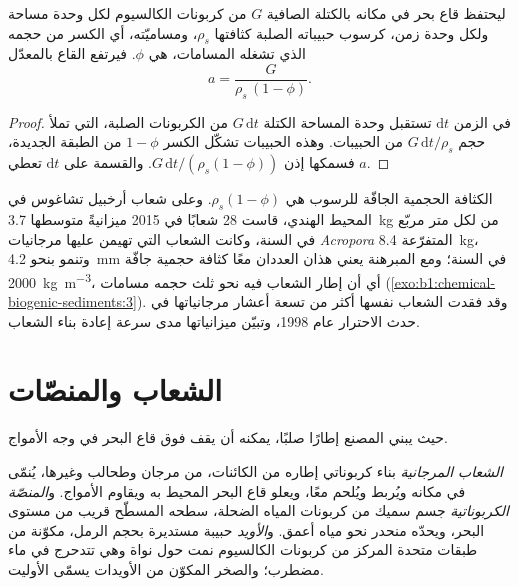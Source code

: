 \begin{proposition}\label{prop:b1:chemical-biogenic-sediments:accretion}
ليحتفظ قاع بحر في مكانه بالكتلة الصافية $G$ من كربونات الكالسيوم لكل وحدة مساحة ولكل وحدة زمن، كرسوب حبيباته الصلبة كثافتها $\rho_s$، ومساميّته، أي الكسر من حجمه الذي تشغله المسامات، هي $\phi$. فيرتفع القاع بالمعدّل
\[
a = \frac{G}{\rho_s\,(1-\phi)}.
\]
\end{proposition}

\begin{proof}
في الزمن $\mathrm dt$ تستقبل وحدة المساحة الكتلة $G\,\mathrm dt$ من الكربونات الصلبة، التي تملأ حجم $G\,\mathrm dt/\rho_s$ من الحبيبات. وهذه الحبيبات تشكّل الكسر $1-\phi$ من الطبقة الجديدة، فسمكها إذن $G\,\mathrm dt/(\rho_s(1-\phi))$. والقسمة على $\mathrm dt$ تعطي $a$.
\end{proof}

الكثافة الحجمية الجافّة للرسوب هي $\rho_s(1-\phi)$. وعلى شعاب أرخبيل تشاغوس في المحيط الهندي، قاست 28 شعابًا في 2015 ميزانيةً متوسطها \qty{3.7}{kg} من  لكل متر مربّع في السنة، وكانت الشعاب التي تهيمن عليها مرجانيات \emph{Acropora} المتفرّعة \qty{8.4}{kg}، وتنمو بنحو \qty{4.2}{mm} في السنة؛ ومع المبرهنة يعني هذان العددان معًا كثافة حجمية جافّة \qty{2000}{kg.m^{-3}}، أي أن إطار الشعاب فيه نحو ثلث حجمه مسامات (\cref{exo:b1:chemical-biogenic-sediments:3}). وقد فقدت الشعاب نفسها أكثر من تسعة أعشار مرجانياتها في حدث الاحترار عام 1998، وتبيّن ميزانياتها مدى سرعة إعادة بناء الشعاب.

\section{الشعاب والمنصّات}\label{sec:b1:chemical-biogenic-sediments:reefs}

حيث يبني المصنع إطارًا صلبًا، يمكنه أن يقف فوق قاع البحر في وجه الأمواج.

\begin{definition}\label{def:b1:chemical-biogenic-sediments:reef}
\emph{الشعاب المرجانية} بناء كربوناتي إطاره من الكائنات، من مرجان وطحالب وغيرها، يُنمّى في مكانه ويُربط ويُلحم معًا، ويعلو قاع البحر المحيط به ويقاوم الأمواج. و\emph{المنصّة الكربوناتية} جسم سميك من كربونات المياه الضحلة، سطحه المسطّح قريب من مستوى البحر، ويحدّه منحدر نحو مياه أعمق. و\emph{الأويد} حبيبة مستديرة بحجم الرمل، مكوّنة من طبقات متحدة المركز من كربونات الكالسيوم نمت حول نواة وهي تتدحرج في ماء مضطرب؛ والصخر المكوّن من الأويدات يسمّى الأوليت.
\end{definition}

